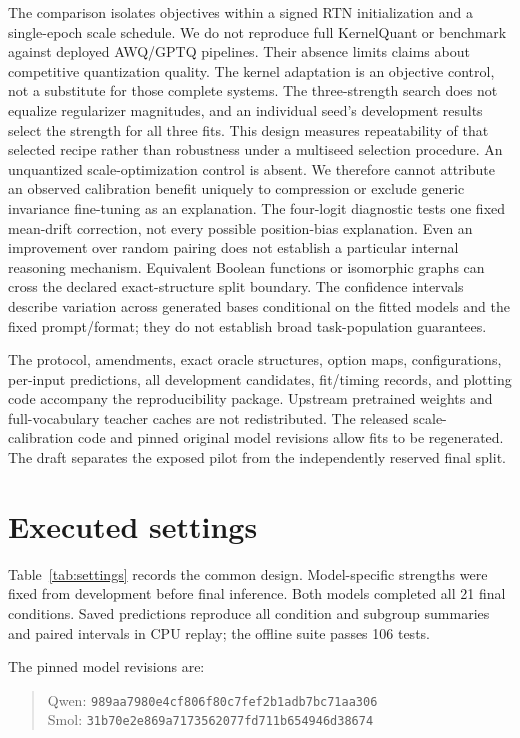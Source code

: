 \documentclass[11pt]{article}
\begin{document}
The comparison isolates objectives within a signed RTN initialization and
a single-epoch scale schedule. We do not reproduce full KernelQuant or
benchmark against deployed AWQ/GPTQ pipelines. Their absence limits claims
about competitive quantization quality. The kernel adaptation is an
objective control, not a substitute for those complete systems.
The three-strength search does not equalize regularizer magnitudes, and an
individual seed's development results select the strength for all three fits.
This design measures repeatability of that selected recipe rather than
robustness under a multiseed selection procedure. An
unquantized scale-optimization control is absent. We therefore cannot attribute
an observed calibration benefit uniquely to compression or exclude generic
invariance fine-tuning as an explanation.
The four-logit diagnostic tests one fixed mean-drift correction, not every
possible position-bias explanation. Even an improvement over random pairing
does not establish a particular internal reasoning mechanism.
Equivalent Boolean functions or isomorphic graphs can cross the declared
exact-structure split boundary. The confidence intervals describe variation
across generated bases conditional on the fitted models and the fixed
prompt/format; they do not establish broad task-population guarantees.

The protocol, amendments, exact oracle structures, option maps, configurations,
per-input predictions, all development candidates, fit/timing records, and
plotting code accompany the reproducibility package. Upstream pretrained
weights and full-vocabulary teacher caches are not redistributed.
The released scale-calibration code and pinned original model revisions
allow fits to be regenerated. The draft separates the exposed pilot from
the independently reserved final split.

\section{Executed settings}
Table~\ref{tab:settings} records the common design. Model-specific strengths
were fixed from development before final inference. Both models completed
all 21 final conditions. Saved predictions reproduce all condition and
subgroup summaries and paired intervals in CPU replay; the offline suite
passes 106 tests.

The pinned model revisions are:
\begin{quote}\small
Qwen: \texttt{989aa7980e4cf806f80c7fef2b1adb7bc71aa306}\\
Smol: \texttt{31b70e2e869a7173562077fd711b654946d38674}
\end{quote}
\end{document}
